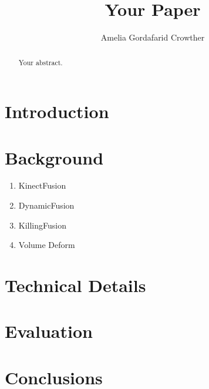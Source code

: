 \documentclass[a4paper]{article}
\title{Your Paper}
\author{Amelia Gordafarid Crowther}
\begin{document}
\begin{abstract}
Your abstract.
\end{abstract}

\section{Introduction}

\section{Background}

\begin{enumerate}
\item KinectFusion \cite{kinfu}
\item DynamicFusion
\item KillingFusion
\item Volume Deform
\end{enumerate}

\section{Technical Details}

\section{Evaluation}

\section{Conclusions}



\end{document}
